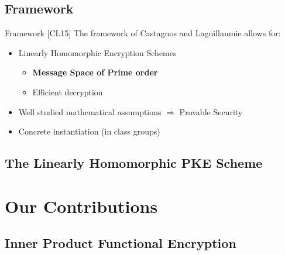 \documentclass[10pt]{beamer}
\begin{document}
\subsection{Framework}
\begin{frame}{Framework [CL15]}
The framework of Castagnos and Laguillaumie allows for:
\begin{itemize}
\item Linearly Homomorphic Encryption Schemes
\begin{itemize}
\item \textbf{Message Space of Prime order}
\item Efficient decryption
\end{itemize}
\item Well studied mathematical assumptions $\Rightarrow$ Provable Security
\item Concrete instantiation (in class groups)
\end{itemize}
\end{frame}





\subsection{The Linearly Homomorphic PKE Scheme}





%

%

%

%


\section{Our Contributions}

\subsection{Inner Product Functional Encryption}





\end{document}

